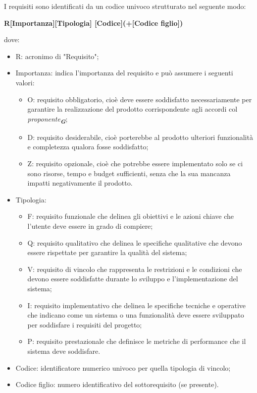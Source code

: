 \begin{enumerate}
I requisiti sono identificati da un codice univoco strutturato nel seguente modo:\\
\begin{center}
    \textbf{R[Importanza][Tipologia] [Codice](+[Codice figlio])}
\end{center}
dove:
\begin{itemize}
    \item R: acronimo di "Requisito";
    \item Importanza: indica l’importanza del requisito e può assumere i seguenti valori:
    \begin{itemize}
        \item O: requisito obbligatorio, cioè deve essere soddisfatto necessariamente per garantire la realizzazione del prodotto corrispondente agli accordi col \emph{proponente}\textsubscript{\textit{\textbf{G}}};
        \item D: requisito desiderabile, cioè porterebbe al prodotto ulteriori funzionalità e completezza qualora fosse soddisfatto;
        \item Z: requisito opzionale, cioè che potrebbe essere implementato solo se ci sono risorse, tempo e budget sufficienti, senza che la sua mancanza impatti negativamente il prodotto.
    \end{itemize}
    \item Tipologia:
        \begin{itemize} 
            \item F: requisito funzionale che delinea gli obiettivi e le azioni chiave che l’utente deve essere in grado di compiere;
            \item Q: requisito qualitativo che delinea le specifiche qualitative che devono essere rispettate per garantire la qualità del sistema;
            \item V: requisito di vincolo che rappresenta le restrizioni e le condizioni che devono essere soddisfatte durante lo sviluppo e l’implementazione del sistema;
            \item I: requisito implementativo che delinea le specifiche tecniche e operative che indicano come un sistema o una funzionalità deve essere sviluppato per soddisfare i requisiti del progetto;  
            \item P: requisito prestazionale che definisce le metriche di performance che il sistema deve soddisfare. 
        \end{itemize}
    \item Codice: identificatore numerico univoco per quella tipologia di vincolo;
    \item Codice figlio: numero identificativo del sottorequisito (se presente).
\end{itemize}


\end{enumerate}
